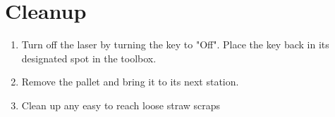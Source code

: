 \documentclass[A4,12pt]{article}
\begin{document}
\section{Cleanup}
\begin{enumerate}
	\item Turn off the laser by turning the key to "Off".  Place the key back in its designated spot in the toolbox.
    \item Remove the pallet and bring it to its next station.
    \item Clean up any easy to reach loose straw scraps
\end{enumerate}
\end{document}
